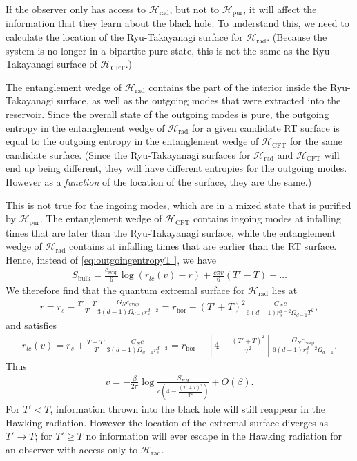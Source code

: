 \documentclass[11pt,a4paper]{article}
\begin{document}
If the observer only has access to $\mathcal{H}_\text{rad}$, but not to $\mathcal{H}_\text{pur}$, it will affect the information that they learn about the black hole. To understand this, we need to calculate the location of the Ryu-Takayanagi surface for $\mathcal{H}_\text{rad}$.  (Because the system is no longer in a bipartite pure state, this is not the same as the Ryu-Takayanagi surface of $\mathcal{H}_\text{CFT}$.)

The entanglement wedge of $\mathcal{H}_\text{rad}$ contains the part of the interior inside the Ryu-Takayanagi surface, as well as the outgoing modes that were extracted into the reservoir. Since the overall state of the outgoing modes is pure, the outgoing entropy in the entanglement wedge of $\mathcal{H}_\text{rad}$ for a given candidate RT surface is equal to the outgoing entropy in the entanglement wedge of $\mathcal{H}_\text{CFT}$ for the same candidate surface. (Since the Ryu-Takayanagi surfaces for $\mathcal{H}_\text{rad}$ and $\mathcal{H}_\text{CFT}$ will end up being different, they will have different entropies for the outgoing modes. However as a \emph{function} of the location of the surface, they are the same.)

This is not true for the ingoing modes, which are in a mixed state that is purified by $\mathcal{H}_\text{pur}$. The entanglement wedge of $\mathcal{H}_\text{CFT}$ contains ingoing modes at infalling times that are later than the Ryu-Takayanagi surface, while the entanglement wedge of $\mathcal{H}_\text{rad}$ contains at infalling times that are earlier than the RT surface. Hence, instead of \eqref{eq:outgoingentropyT'}, we have
\begin{align}
S_\text{bulk} =  \frac{c_\text{evap}}{6}\log\left(r_{lc}(v) - r\right) + \frac{c\pi v}{6}(T' - T) + \dots
\end{align}
We therefore find that the quantum extremal surface for $\mathcal{H}_\text{rad}$ lies at
\begin{align} \label{eq:rqT'}
r = r_s - \frac{T' + T}{T} \frac{G_N c_\text{evap}}{3(d-1) \Omega_{d-1} r_s^{d-2}} = r_\text{hor} - (T'+T)^2 \frac{ G_N c}{6 (d-1) r_s^{d-2} \Omega_{d-1} T^2}, 
\end{align}
and satisfies
\begin{align} \label{eq:rlcT'}
r_{lc}(v) = r_s + \frac{T - T'}{T} \frac{G_N c}{3(d-1) \Omega_{d-1} r_s^{d-2}} = r_\text{hor} +\left[4- \frac{(T'+T)^2}{T^2}\right] \frac{ G_N c_\text{evap}}{6 (d-1) r_s^{d-2} \Omega_{d-1}}.
\end{align}
Thus
\begin{align} \label{eq:vT'}
v = - \frac{\beta}{2 \pi} \log\frac{S_{BH}}{c (4- \frac{(T'+T)^2}{T^2})} + O(\beta).
\end{align}
For $T' < T$, information thrown into the black hole will still reappear in the Hawking radiation. However the location of the extremal surface diverges as $T' \to T$; for $T'\geq T$ no information will ever escape in the Hawking radiation for an observer with access only to $\mathcal{H}_\text{rad}$. 
\end{document}
